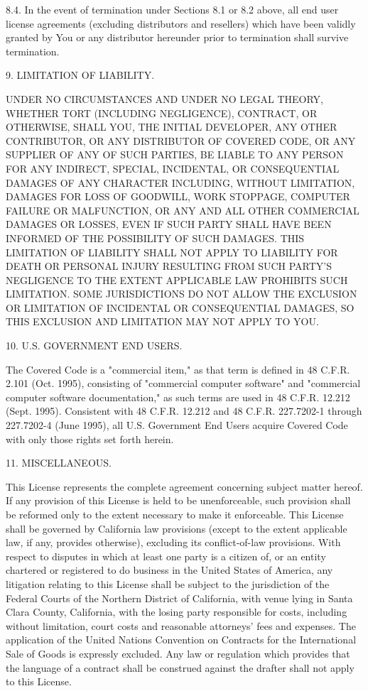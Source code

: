 \begin{DoxyCode}
     8.4.  In the event of termination under Sections 8.1 or 8.2 above,
     all end user license agreements (excluding distributors and resellers)
     which have been validly granted by You or any distributor hereunder
     prior to termination shall survive termination.

9. LIMITATION OF LIABILITY.

     UNDER NO CIRCUMSTANCES AND UNDER NO LEGAL THEORY, WHETHER TORT
     (INCLUDING NEGLIGENCE), CONTRACT, OR OTHERWISE, SHALL YOU, THE INITIAL
     DEVELOPER, ANY OTHER CONTRIBUTOR, OR ANY DISTRIBUTOR OF COVERED CODE,
     OR ANY SUPPLIER OF ANY OF SUCH PARTIES, BE LIABLE TO ANY PERSON FOR
     ANY INDIRECT, SPECIAL, INCIDENTAL, OR CONSEQUENTIAL DAMAGES OF ANY
     CHARACTER INCLUDING, WITHOUT LIMITATION, DAMAGES FOR LOSS OF GOODWILL,
     WORK STOPPAGE, COMPUTER FAILURE OR MALFUNCTION, OR ANY AND ALL OTHER
     COMMERCIAL DAMAGES OR LOSSES, EVEN IF SUCH PARTY SHALL HAVE BEEN
     INFORMED OF THE POSSIBILITY OF SUCH DAMAGES. THIS LIMITATION OF
     LIABILITY SHALL NOT APPLY TO LIABILITY FOR DEATH OR PERSONAL INJURY
     RESULTING FROM SUCH PARTY'S NEGLIGENCE TO THE EXTENT APPLICABLE LAW
     PROHIBITS SUCH LIMITATION. SOME JURISDICTIONS DO NOT ALLOW THE
     EXCLUSION OR LIMITATION OF INCIDENTAL OR CONSEQUENTIAL DAMAGES, SO
     THIS EXCLUSION AND LIMITATION MAY NOT APPLY TO YOU.

10. U.S. GOVERNMENT END USERS.

     The Covered Code is a "commercial item," as that term is defined in
     48 C.F.R. 2.101 (Oct. 1995), consisting of "commercial computer
     software" and "commercial computer software documentation," as such
     terms are used in 48 C.F.R. 12.212 (Sept. 1995). Consistent with 48
     C.F.R. 12.212 and 48 C.F.R. 227.7202-1 through 227.7202-4 (June 1995),
     all U.S. Government End Users acquire Covered Code with only those
     rights set forth herein.

11. MISCELLANEOUS.

     This License represents the complete agreement concerning subject
     matter hereof. If any provision of this License is held to be
     unenforceable, such provision shall be reformed only to the extent
     necessary to make it enforceable. This License shall be governed by
     California law provisions (except to the extent applicable law, if
     any, provides otherwise), excluding its conflict-of-law provisions.
     With respect to disputes in which at least one party is a citizen of,
     or an entity chartered or registered to do business in the United
     States of America, any litigation relating to this License shall be
     subject to the jurisdiction of the Federal Courts of the Northern
     District of California, with venue lying in Santa Clara County,
     California, with the losing party responsible for costs, including
     without limitation, court costs and reasonable attorneys' fees and
     expenses. The application of the United Nations Convention on
     Contracts for the International Sale of Goods is expressly excluded.
     Any law or regulation which provides that the language of a contract
     shall be construed against the drafter shall not apply to this
     License.


\end{DoxyCode}
